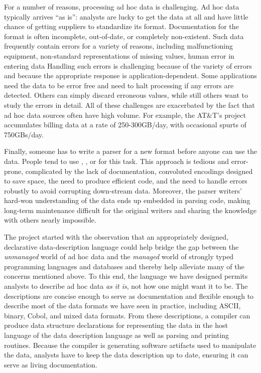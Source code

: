 \documentclass{sig-alternate}
\begin{document}
For a number of reasons, processing ad hoc data is challenging.  Ad
hoc data typically arrives ``as is'': analysts are lucky to get the
data at all and have little chance of getting suppliers to standardize
its format.  Documentation for the format is often incomplete,
out-of-date, or completely non-existent.  Such data frequently contain
errors for a variety of reasons, including malfunctioning equipment,
non-standard representations of missing values, human error in
entering data \etc{}  Handling such errors is challenging because of
the variety of errors and because the appropriate response is 
application-dependent. Some applications need the data to be error
free and need to halt processing if any errors are detected.  Others
can simply discard erroneous values, while still others want to study
the errors in detail.  All of these challenges are exacerbated by the
fact that ad hoc data sources often have high volume.  For example, 
the AT\&T's \ningaui{} project accumulates billing data at a rate
of 250-300GB/day, with occasional spurts of 750GBs/day.

Finally, someone has to write a parser for a new format before anyone
can use the data. People tend to use \C{}, \perl{}, or \python{} for
this task.  This approach is tedious and error-prone, complicated by
the lack of documentation, convoluted encodings designed to save
space, the need to produce efficient code, and the need to handle
errors robustly to avoid corrupting down-stream data.  Moreover, the
parser writers' hard-won understanding of the data ends up embedded in
parsing code, making long-term maintenance difficult for the original
writers and sharing the knowledge with others nearly impossible.

The \pads{} project started with the observation that an appropriately
designed, declarative data-description language could 
help bridge the gap
between the {\em unmanaged} world of ad hoc data and the {\em managed} world
of strongly typed programming languages and databases and thereby
help alleviate many of the concerns mentioned above.  To this end,
the language we have designed permits analysts to describe ad hoc 
data \textit{as it is}, not
how one might want it to be. The descriptions are concise enough to
serve as documentation and flexible enough to describe most of the
data formats we have seen in practice, including ASCII, binary, Cobol,
and mixed data formats.  From these descriptions, a compiler can
produce data structure declarations for representing the data in the
host language of the data description language as well as parsing and
printing routines.  Because the compiler is generating software
artifacts used to manipulate the data, analysts have to keep the data
description up to date, ensuring it can serve as living documentation.
\end{document}
